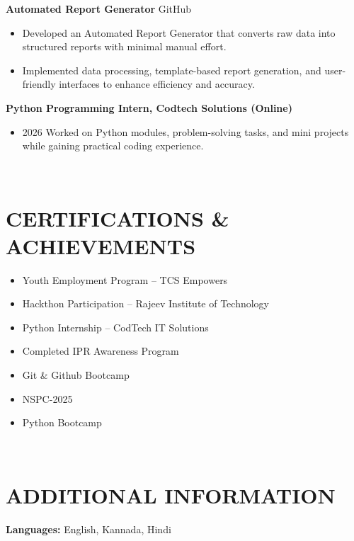 \documentclass[10pt,a4paper]{extarticle}
\begin{document}
\noindent \textbf{Automated Report Generator} \hfill GitHub
\begin{itemize}[leftmargin=*, parsep=0pt, itemsep=1pt, topsep=1pt]
    \item Developed an Automated Report Generator that converts raw data into structured reports with minimal manual effort.
    \item Implemented data processing, template-based report generation, and user-friendly interfaces to enhance efficiency and accuracy.
\end{itemize}

\noindent \textbf{Python Programming Intern, Codtech Solutions (Online)}
\begin{itemize}[leftmargin=*, parsep=0pt, itemsep=1pt, topsep=1pt]
    \item 2026 Worked on Python modules, problem-solving tasks, and mini projects while gaining practical coding experience.
\end{itemize}


\\

\section*{CERTIFICATIONS \& ACHIEVEMENTS}

\begin{itemize}[leftmargin=*, parsep=0pt, itemsep=1pt, topsep=1pt]
    \item Youth Employment Program – TCS Empowers
    \item Hackthon Participation – Rajeev Institute of Technology
    \item Python Internship – CodTech IT Solutions
    \item Completed IPR Awareness Program
    \item Git \& Github Bootcamp
    \item NSPC-2025
    \item Python Bootcamp
\end{itemize}


\\

\section*{ADDITIONAL INFORMATION}

\textbf{Languages:} English, Kannada, Hindi
\end{document}
